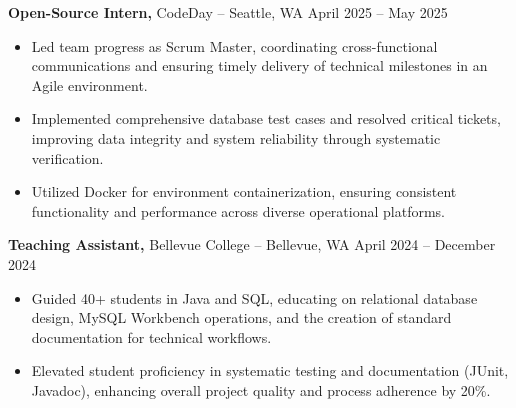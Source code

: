 \documentclass[11pt]{article}       %
\begin{document}

\textbf{Open-Source Intern,} {CodeDay} -- Seattle, WA \hfill April 2025 -- May 2025 \\
\vspace{-9pt}
\begin{itemize}
  \item Led team progress as Scrum Master, coordinating cross-functional communications and ensuring timely delivery of technical milestones in an Agile environment.
  \item Implemented comprehensive database test cases and resolved critical tickets, improving data integrity and system reliability through systematic verification.
  \item Utilized Docker for environment containerization, ensuring consistent functionality and performance across diverse operational platforms.
\end{itemize}

\textbf{Teaching Assistant,} {Bellevue College} -- Bellevue, WA \hfill April 2024 -- December 2024 \\
\vspace{-9pt}
\begin{itemize}
  \item Guided 40+ students in Java and SQL, educating on relational database design, MySQL Workbench operations, and the creation of standard documentation for technical workflows.
  \item Elevated student proficiency in systematic testing and documentation (JUnit, Javadoc), enhancing overall project quality and process adherence by 20\%.
\end{itemize}
\end{document}
